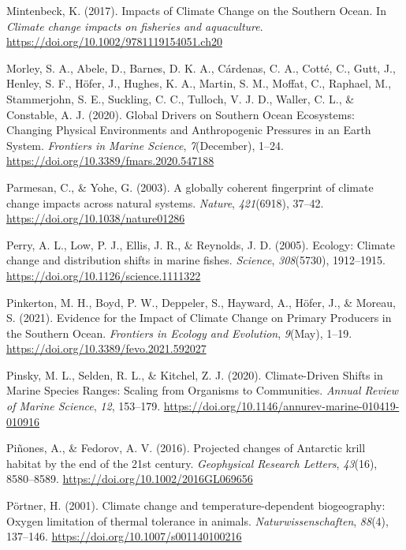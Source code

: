 \documentclass[
]{article}
\newlength{\cslhangindent}
\newenvironment{cslreferences}%
  {\setlength{\parindent}{0pt}%
  \everypar{\setlength{\hangindent}{\cslhangindent}}\ignorespaces}%
  {\par}
\begin{document}
\begin{cslreferences}
\leavevmode\hypertarget{ref-Mintenbeck2017}{}%
Mintenbeck, K. (2017). Impacts of Climate Change on the Southern Ocean.
In \emph{Climate change impacts on fisheries and aquaculture}.
\url{https://doi.org/10.1002/9781119154051.ch20}

\leavevmode\hypertarget{ref-Morley2020}{}%
Morley, S. A., Abele, D., Barnes, D. K. A., Cárdenas, C. A., Cotté, C.,
Gutt, J., Henley, S. F., Höfer, J., Hughes, K. A., Martin, S. M.,
Moffat, C., Raphael, M., Stammerjohn, S. E., Suckling, C. C., Tulloch,
V. J. D., Waller, C. L., \& Constable, A. J. (2020). Global Drivers on
Southern Ocean Ecosystems: Changing Physical Environments and
Anthropogenic Pressures in an Earth System. \emph{Frontiers in Marine
Science}, \emph{7}(December), 1--24.
\url{https://doi.org/10.3389/fmars.2020.547188}

\leavevmode\hypertarget{ref-Parmesan2003}{}%
Parmesan, C., \& Yohe, G. (2003). A globally coherent fingerprint of
climate change impacts across natural systems. \emph{Nature},
\emph{421}(6918), 37--42. \url{https://doi.org/10.1038/nature01286}

\leavevmode\hypertarget{ref-Perry2005}{}%
Perry, A. L., Low, P. J., Ellis, J. R., \& Reynolds, J. D. (2005).
Ecology: Climate change and distribution shifts in marine fishes.
\emph{Science}, \emph{308}(5730), 1912--1915.
\url{https://doi.org/10.1126/science.1111322}

\leavevmode\hypertarget{ref-Pinkerton2021}{}%
Pinkerton, M. H., Boyd, P. W., Deppeler, S., Hayward, A., Höfer, J., \&
Moreau, S. (2021). Evidence for the Impact of Climate Change on Primary
Producers in the Southern Ocean. \emph{Frontiers in Ecology and
Evolution}, \emph{9}(May), 1--19.
\url{https://doi.org/10.3389/fevo.2021.592027}

\leavevmode\hypertarget{ref-Pinsky2020}{}%
Pinsky, M. L., Selden, R. L., \& Kitchel, Z. J. (2020). Climate-Driven
Shifts in Marine Species Ranges: Scaling from Organisms to Communities.
\emph{Annual Review of Marine Science}, \emph{12}, 153--179.
\url{https://doi.org/10.1146/annurev-marine-010419-010916}

\leavevmode\hypertarget{ref-Pinones2016}{}%
Piñones, A., \& Fedorov, A. V. (2016). Projected changes of Antarctic
krill habitat by the end of the 21st century. \emph{Geophysical Research
Letters}, \emph{43}(16), 8580--8589.
\url{https://doi.org/10.1002/2016GL069656}

\leavevmode\hypertarget{ref-Portner2001}{}%
Pörtner, H. (2001). Climate change and temperature-dependent
biogeography: Oxygen limitation of thermal tolerance in animals.
\emph{Naturwissenschaften}, \emph{88}(4), 137--146.
\url{https://doi.org/10.1007/s001140100216}


\end{cslreferences}
\end{document}
